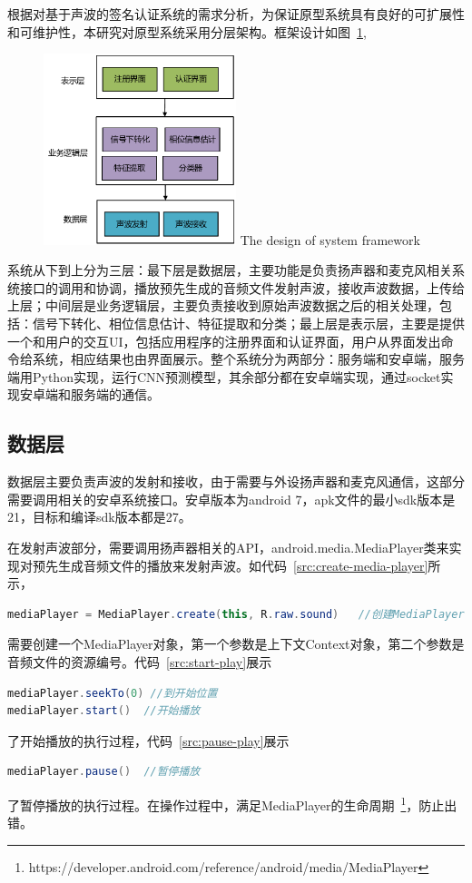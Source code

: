 根据对基于声波的签名认证系统的需求分析，为保证原型系统具有良好的可扩展性和可维护性，本研究对原型系统采用分层架构。框架设计如图~\ref{fig:system-framework},
\begin{figure}[!htp]
  \centering
  \includegraphics[width=0.5\textwidth]{figure/prototype-architecture.pdf}
      {The design of system framework}
  \label{fig:system-framework}
\end{figure}
系统从下到上分为三层：最下层是数据层，主要功能是负责扬声器和麦克风相关系统接口的调用和协调，播放预先生成的音频文件发射声波，接收声波数据，上传给上层；中间层是业务逻辑层，主要负责接收到原始声波数据之后的相关处理，包括：信号下转化、相位信息估计、特征提取和分类；最上层是表示层，主要是提供一个和用户的交互UI，包括应用程序的注册界面和认证界面，用户从界面发出命令给系统，相应结果也由界面展示。整个系统分为两部分：服务端和安卓端，服务端用Python实现，运行CNN预测模型，其余部分都在安卓端实现，通过socket实现安卓端和服务端的通信。 


\subsection{数据层}
数据层主要负责声波的发射和接收，由于需要与外设扬声器和麦克风通信，这部分需要调用相关的安卓系统接口。安卓版本为android 7，apk文件的最小sdk版本是21，目标和编译sdk版本都是27。

在发射声波部分，需要调用扬声器相关的API，android.media.MediaPlayer类来实现对预先生成音频文件的播放来发射声波。如代码~\ref{src:create-media-player}所示，

\begin{lstlisting}[language={Java}, caption={创建MediaPlayer对象 \label{src:create-media-player}}]
mediaPlayer = MediaPlayer.create(this, R.raw.sound)   //创建MediaPlayer对象
\end{lstlisting}
需要创建一个MediaPlayer对象，第一个参数是上下文Context对象，第二个参数是音频文件的资源编号。代码~\ref{src:start-play}展示
\begin{lstlisting}[language={Java}, caption={开始播放 \label{src:start-play}}]
mediaPlayer.seekTo(0) //到开始位置
mediaPlayer.start()  //开始播放
\end{lstlisting}
了开始播放的执行过程，代码~\ref{src:pause-play}展示
\begin{lstlisting}[language={Java}, caption={暂停播放\label{src:pause-play}} ]
mediaPlayer.pause()  //暂停播放
\end{lstlisting}
了暂停播放的执行过程。在操作过程中，满足MediaPlayer的生命周期~\footnote{https://developer.android.com/reference/android/media/MediaPlayer}，防止出错。

